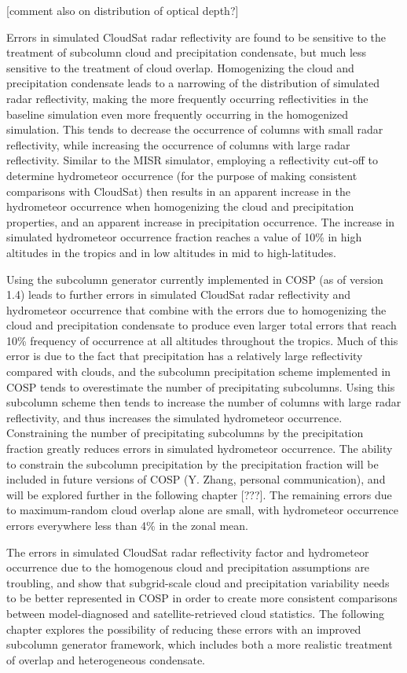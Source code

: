 [comment also on distribution of optical depth?]

Errors in simulated CloudSat radar reflectivity are found to be sensitive to the treatment of subcolumn cloud and precipitation condensate, but much less sensitive to the treatment of cloud overlap. Homogenizing the cloud and precipitation condensate leads to a narrowing of the distribution of simulated radar reflectivity, making the more frequently occurring reflectivities in the baseline simulation even more frequently occurring in the homogenized simulation. This tends to decrease the occurrence of columns with small radar reflectivity, while increasing the occurrence of columns with large radar reflectivity. Similar to the MISR simulator, employing a reflectivity cut-off to determine hydrometeor occurrence (for the purpose of making consistent comparisons with CloudSat) then results in an apparent increase in the hydrometeor occurrence when homogenizing the cloud and precipitation properties, and an apparent increase in precipitation occurrence. The increase in simulated hydrometeor occurrence fraction reaches a value of 10\% in high altitudes in the tropics and in low altitudes in mid to high-latitudes.  

Using the subcolumn generator currently implemented in COSP (as of version 1.4) leads to further errors in simulated CloudSat radar reflectivity and hydrometeor occurrence that combine with the errors due to homogenizing the cloud and precipitation condensate to produce even larger total errors that reach 10\% frequency of occurrence at all altitudes throughout the tropics. Much of this error is due to the fact that precipitation has a relatively large reflectivity compared with clouds, and the subcolumn precipitation scheme implemented in COSP tends to overestimate the number of precipitating subcolumns. Using this subcolumn scheme then tends to increase the number of columns with large radar reflectivity, and thus increases the simulated hydrometeor occurrence.  Constraining the number of precipitating subcolumns by the precipitation fraction greatly reduces errors in simulated hydrometeor occurrence. The ability to constrain the subcolumn precipitation by the precipitation fraction will be included in future versions of COSP (Y. Zhang, personal communication), and will be explored further in the following chapter [???]. The remaining errors due to maximum-random cloud overlap alone are small, with hydrometeor occurrence errors everywhere less than 4\% in the zonal mean.

The errors in simulated CloudSat radar reflectivity factor and hydrometeor occurrence due to the homogenous cloud and precipitation assumptions are troubling, and show that subgrid-scale cloud and precipitation variability needs to be better represented in COSP in order to create more consistent comparisons between model-diagnosed and satellite-retrieved cloud statistics. The following chapter explores the possibility of reducing these errors with an improved subcolumn generator framework, which includes both a more realistic treatment of overlap and heterogeneous condensate.

